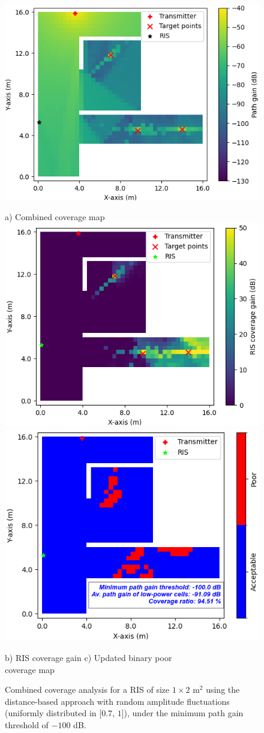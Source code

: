 \documentclass{IEEEoj}
\begin{document}
\begin{figure}
	\centering
	\includegraphics[width=0.8\linewidth]{Sim_Results/amp_change_Comb_cov_1x2_Distance.png}
	
	a) Combined coverage map \\[5pt]
	
	\includegraphics[width=0.49\linewidth]{Sim_Results/amp_change_RIS_cov_gain_1x2_Distance.png}
	\hfill
	\includegraphics[width=0.48\linewidth]{Sim_Results/amp_change_New_Binary_Cov_Map_1x2_Distance.png}
	
	\hspace{10pt} b) RIS coverage gain \hspace{30pt} c) Updated binary poor \\ \hspace{140pt} coverage map
	\caption{Combined coverage analysis for a RIS of size $1 \times 2$ m$^2$ using the distance-based approach with random amplitude fluctuations (uniformly distributed in [$0.7$, $1$]), under the minimum path gain threshold of $-100$ dB.}
	\label{amp_change_comb_cov_distance}
\end{figure}
\end{document}
